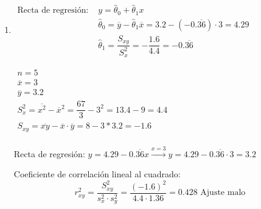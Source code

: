 \begin{enumerate}[label=\color{red}\arabic*),leftmargin=*]
	$h_{\mathrm{top}}=\mu_Y+\dfrac{\cov(X,Y)}{\sigma_X^2}(x-\mu_X)=2+\dfrac{-1}{2}(x-1)=-\dfrac{x}{2}+\dfrac{5}{2}\longrightarrow h_{\mathrm{opt}}(1.5)=2-\dfrac{1}{2}\cdot\dfrac{1}{2}=\bboxed{\dfrac{7}{4}}$
	
	\item {}
	
	$\begin{aligned}
		\text{Recta de regresión: } & y=\hat{\theta}_0+\hat{\theta}_1x\\
		&\hat{\theta}_0=\overline{y}-\hat{\theta}_1\overline{x}=3.2-(-0.\overline{36})\cdot3=4.29\\
		&\hat{\theta}_1=\dfrac{S_{xy}}{S_x^2}=-\dfrac{1.6}{4.4}=-0.\overline{36}
	\end{aligned}$
	
	$\begin{array}{l}
		n=5\\
		\overline{x}=3\\
		\overline{y}=3.2\\
		S_x^2=\overline{x^2}-\overline{x}^2=\dfrac{67}{3}-3^2=13.4-9=4.4\\
		S_{xy}=\overline{xy}-\overline{x}\cdot\overline{y}=8-3*3.2=-1.6\\
	\end{array}$
	
	Recta de regresión: $y=4.29-0.\overline{36}x\xrightarrow{x=3}y=4.29-0.\overline{36}\cdot3=3.2$
	
	Coeficiente de correlación lineal al cuadrado: \[ r_{xy}^2=\dfrac{S_{xy}^2}{s_x^2\cdot s_y^2}=\dfrac{(-1.6)^2}{4.4\cdot1.36}=0.428\text{ Ajuste malo} \]
	

\end{enumerate}
